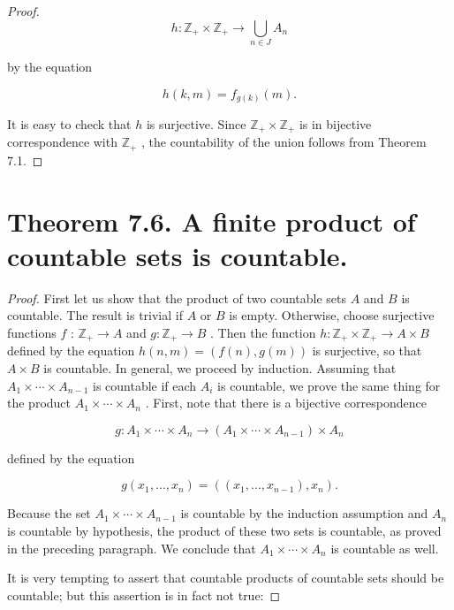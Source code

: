 \begin{theorem}
\begin{proof}
\[
h : {\mathbb{Z}}_{ + } \times  {\mathbb{Z}}_{ + } \rightarrow  \mathop{\bigcup }\limits_{{n \in  J}}{A}_{n}
\]

by the equation

\[
h\left( {k,m}\right)  = {f}_{g\left( k\right) }\left( m\right) .
\]

It is easy to check that \(h\) is surjective. Since \({\mathbb{Z}}_{ + } \times  {\mathbb{Z}}_{ + }\) is in bijective correspondence with \({\mathbb{Z}}_{ + }\) , the countability of the union follows from Theorem 7.1.
\end{proof}
\section*{Theorem 7.6. A finite product of countable sets is countable.}

\begin{proof}First let us show that the product of two countable sets \(A\) and \(B\) is countable. The result is trivial if \(A\) or \(B\) is empty. Otherwise, choose surjective functions \(f\) : \({\mathbb{Z}}_{ + } \rightarrow  A\) and \(g : {\mathbb{Z}}_{ + } \rightarrow  B\) . Then the function \(h : {\mathbb{Z}}_{ + } \times  {\mathbb{Z}}_{ + } \rightarrow  A \times  B\) defined by the equation \(h\left( {n,m}\right)  = \left( {f\left( n\right) ,g\left( m\right) }\right)\) is surjective, so that \(A \times  B\) is countable.
In general, we proceed by induction. Assuming that \({A}_{1} \times  \cdots  \times  {A}_{n - 1}\) is countable if each \({A}_{i}\) is countable, we prove the same thing for the product \({A}_{1} \times  \cdots  \times  {A}_{n}\) . First, note that there is a bijective correspondence

\[
g : {A}_{1} \times  \cdots  \times  {A}_{n} \rightarrow  \left( {{A}_{1} \times  \cdots  \times  {A}_{n - 1}}\right)  \times  {A}_{n}
\]

defined by the equation

\[
g\left( {{x}_{1},\ldots ,{x}_{n}}\right)  = \left( {\left( {{x}_{1},\ldots ,{x}_{n - 1}}\right) ,{x}_{n}}\right) .
\]

Because the set \({A}_{1} \times  \cdots  \times  {A}_{n - 1}\) is countable by the induction assumption and \({A}_{n}\) is countable by hypothesis, the product of these two sets is countable, as proved in the preceding paragraph. We conclude that \({A}_{1} \times  \cdots  \times  {A}_{n}\) is countable as well.

It is very tempting to assert that countable products of countable sets should be countable; but this assertion is in fact not true:
\end{proof}
\end{theorem}

